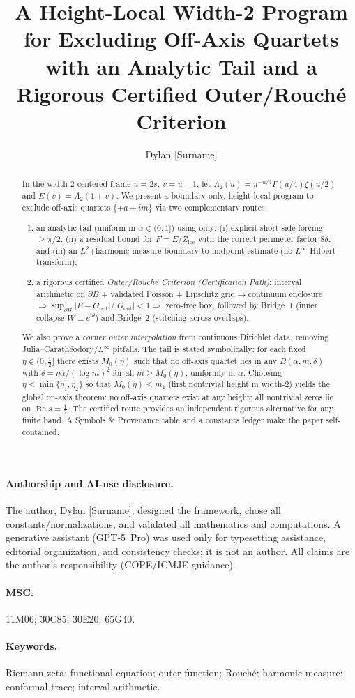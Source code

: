 \documentclass[11pt]{article}
\title{\Large A Height-Local Width-2 Program for Excluding Off-Axis Quartets\\[2pt]
\large with an Analytic Tail and a Rigorous Certified Outer/Rouch\'e Criterion}
\author{Dylan [Surname]}
\date{} %
\numberwithin{equation}{section}
\theoremstyle{remark}
\DeclareMathOperator{\Real}{Re}
\newcommand{\LamTwo}{\Lambda_2}
\newcommand{\Gout}{G_{\mathrm{out}}}
\newcommand{\Zloc}{Z_{\mathrm{loc}}}
\begin{document}
\maketitle

\paragraph{Authorship and AI-use disclosure.}
The author, Dylan [Surname], designed the framework, chose all constants/normalizations, and validated all mathematics and computations. A generative assistant (GPT-5~Pro) was used only for typesetting assistance, editorial organization, and consistency checks; it is not an author. All claims are the author's responsibility (COPE/ICMJE guidance).

\paragraph{MSC.} 11M06; 30C85; 30E20; 65G40.
\paragraph{Keywords.} Riemann zeta; functional equation; outer function; Rouch\'e; harmonic measure; conformal trace; interval arithmetic.

\begin{abstract}
In the width-2 centered frame $u=2s$, $v=u-1$, let $\LamTwo(u)=\pi^{-u/4}\Gamma(u/4)\zeta(u/2)$ and $E(v)=\LamTwo(1+v)$. We present a boundary-only, height-local program to exclude off-axis quartets $\{\pm a\pm i m\}$ via two complementary routes:
\begin{enumerate}[(1)]
\item an analytic tail (uniform in $\alpha\in(0,1]$) using only: (i) explicit short-side forcing $\ge \pi/2$; (ii) a residual bound for $F=E/\Zloc$ with the correct perimeter factor $8\delta$; and (iii) an $L^2$+harmonic-measure boundary-to-midpoint estimate (no $L^\infty$ Hilbert transform);
\item a rigorous certified \emph{Outer/Rouch\'e Criterion (Certification Path)}: interval arithmetic on $\partial B$ + validated Poisson + Lipschitz grid$\to$continuum enclosure $\Rightarrow \sup_{\partial B}\!\big|E-\Gout\big|/|\Gout|<1 \Rightarrow$ zero-free box, followed by Bridge~1 (inner collapse $W\equiv e^{i\theta}$) and Bridge~2 (stitching across overlaps).
\end{enumerate}
We also prove a \emph{corner outer interpolation} from continuous Dirichlet data, removing Julia--Carath\'eodory/$L^\infty$ pitfalls. The tail is stated symbolically: for each fixed $\eta\in(0,\tfrac12]$ there exists $M_0(\eta)$ such that no off-axis quartet lies in any $B(\alpha,m,\delta)$ with $\delta=\eta\alpha/(\log m)^2$ for all $m\ge M_0(\eta)$, uniformly in $\alpha$. Choosing $\eta\le\min\{\eta_1,\eta_2\}$ so that $M_0(\eta)\le m_1$ (first nontrivial height in width-2) yields the global on-axis theorem: no off-axis quartets exist at any height; all nontrivial zeros lie on $\Real s=\tfrac12$. The certified route provides an independent rigorous alternative for any finite band. A Symbols \& Provenance table and a constants ledger make the paper self-contained.
\end{abstract}
\end{document}
